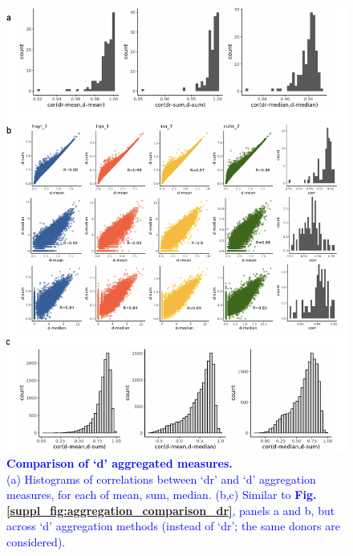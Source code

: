 \begin{figure}[h]
    \centering
    \includegraphics[width=15cm]{Appendix2/Fig/supp_aggregated_figures_d.png}
    \caption[Comparison of `d' aggregated measures]{\textcolor{blue}{\textbf{Comparison of `d' aggregated measures.}\\
    (a) Histograms of correlations between `dr' and `d' aggregation measures, for each of mean, sum, median.
    (b,c) Similar to \textbf{Fig. \ref{suppl_fig:aggregation_comparison_dr}}, panels a and b, but across `d' aggregation methods (instead of `dr'; the same donors are considered).}}
    \label{suppl_fig:aggregation_comparison_d}
\end{figure}

